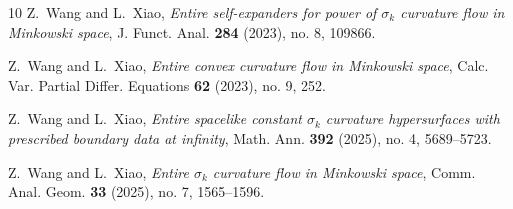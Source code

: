 \documentclass[reqno]{amsart}
\theoremstyle{remark}
\theoremstyle{definition}
\numberwithin{equation}{section}
\begin{document}
\begin{thebibliography}{10}
 Z.~Wang and L.~Xiao, {\em Entire self-expanders for power of $\sigma_k$ curvature flow in Minkowski space}, J. Funct. Anal. {\bf 284} (2023), no. 8, 109866.

 Z.~Wang and L.~Xiao, {\em Entire convex curvature flow in Minkowski space}, Calc. Var. Partial Differ. Equations {\bf 62} (2023), no. 9, 252.

 Z.~Wang and L.~Xiao, {\em Entire spacelike constant $\sigma_k$ curvature hypersurfaces with prescribed boundary data at infinity}, Math. Ann. {\bf 392} (2025), no. 4, 5689--5723.

 Z.~Wang and L.~Xiao, {\em Entire $\sigma_k$ curvature flow in Minkowski space}, Comm. Anal. Geom. {\bf 33} (2025), no. 7, 1565--1596.

\end{thebibliography}
\end{document}
